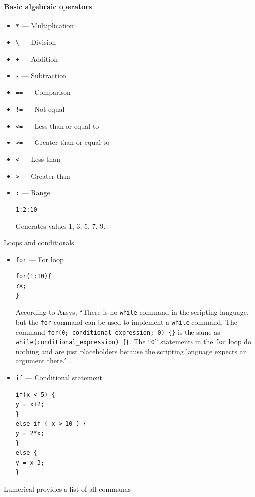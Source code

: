 \paragraph*{Basic algebraic operators}
\begin{itemize}
\item \texttt{*} --- Multiplication
\item \texttt{\textbackslash} --- Division
\item \texttt{+} --- Addition
\item \texttt{-} --- Subtraction
\item \texttt{==} --- Comparison
\item \texttt{!=} --- Not equal
\item \texttt{<=} --- Less than or equal to
\item \texttt{>=} --- Greater than or equal to
\item \texttt{<} --- Less than
\item \texttt{>} --- Greater than
\item \texttt{:} --- Range
\begin{lstlisting}
1:2:10
\end{lstlisting}
Generates values 1, 3, 5, 7, 9.
\end{itemize}

Loops and conditionals
\begin{itemize}
\item \texttt{for} --- For loop
\begin{lstlisting}
for(1:10){ 
?x; 
} 
\end{lstlisting}

According to Ansys, ``There is no \texttt{while} command in the scripting language, but the \texttt{for} command can be used to implement a \texttt{while} command. The command \texttt{for(0; conditional\_expression; 0) \{\}} is the same as \texttt{while(conditional\_expression) \{\}}. The ``\texttt{0}'' statements in the \texttt{for} loop do nothing and are just placeholders because the scripting language expects an argument there.''~\cite{ansys_for_command}.

\item \texttt{if} --- Conditional statement
\begin{lstlisting}
if(x < 5) {
y = x+2;
} 
else if ( x > 10 ) {
y = 2*x;
} 
else {
y = x-3;
} 
\end{lstlisting}
\end{itemize}

Lumerical provides a list of all commands~\cite{ansys_lsf_commands}



